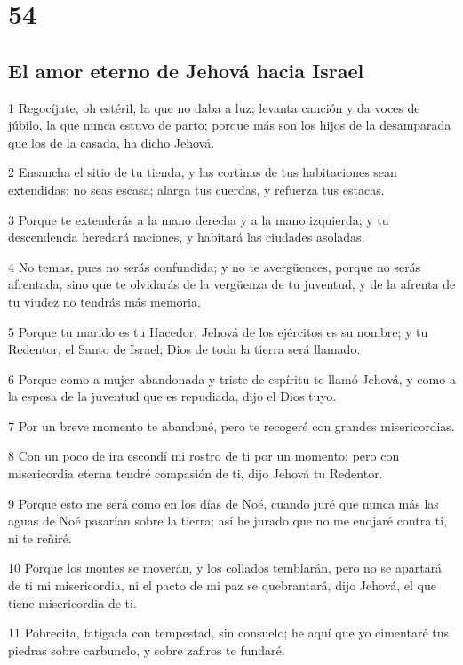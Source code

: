 \chapter{54}

\section*{El amor eterno de Jehová hacia Israel}

\par 1 Regocíjate, oh estéril, la que no daba a luz; levanta canción y da voces de júbilo, la que nunca estuvo de parto; porque más son los hijos de la desamparada que los de la casada, ha dicho Jehová.
\par 2 Ensancha el sitio de tu tienda, y las cortinas de tus habitaciones sean extendidas; no seas escasa; alarga tus cuerdas, y refuerza tus estacas.
\par 3 Porque te extenderás a la mano derecha y a la mano izquierda; y tu descendencia heredará naciones, y habitará las ciudades asoladas.
\par 4 No temas, pues no serás confundida; y no te avergüences, porque no serás afrentada, sino que te olvidarás de la vergüenza de tu juventud, y de la afrenta de tu viudez no tendrás más memoria.
\par 5 Porque tu marido es tu Hacedor; Jehová de los ejércitos es su nombre; y tu Redentor, el Santo de Israel; Dios de toda la tierra será llamado.
\par 6 Porque como a mujer abandonada y triste de espíritu te llamó Jehová, y como a la esposa de la juventud que es repudiada, dijo el Dios tuyo.
\par 7 Por un breve momento te abandoné, pero te recogeré con grandes misericordias.
\par 8 Con un poco de ira escondí mi rostro de ti por un momento; pero con misericordia eterna tendré compasión de ti, dijo Jehová tu Redentor.
\par 9 Porque esto me será como en los días de Noé, cuando juré que nunca más las aguas de Noé pasarían sobre la tierra; así he jurado que no me enojaré contra ti, ni te reñiré.
\par 10 Porque los montes se moverán, y los collados temblarán, pero no se apartará de ti mi misericordia, ni el pacto de mi paz se quebrantará, dijo Jehová, el que tiene misericordia de ti.
\par 11 Pobrecita, fatigada con tempestad, sin consuelo; he aquí que yo cimentaré tus piedras sobre carbunclo, y sobre zafiros te fundaré.
